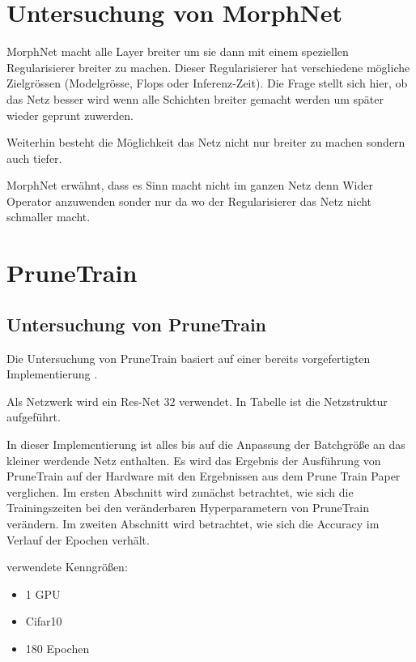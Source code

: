 \chapter{Untersuchung von MorphNet}\label{sec:morphexperimente}
MorphNet macht alle Layer breiter um sie dann mit einem speziellen Regularisierer breiter zu machen. Dieser Regularisierer hat verschiedene mögliche Zielgrössen (Modelgrösse, Flops oder Inferenz-Zeit).
Die Frage stellt sich hier, ob das Netz besser wird wenn alle Schichten breiter gemacht werden um später wieder geprunt zuwerden.

Weiterhin besteht die Möglichkeit das Netz nicht nur breiter zu machen sondern auch tiefer.


MorphNet erwähnt, dass es Sinn macht nicht im ganzen Netz denn Wider Operator anzuwenden sonder nur da wo der Regularisierer das Netz nicht schmaller macht.





\chapter{PruneTrain}
\color{black}
\section{Untersuchung von PruneTrain}\label{sec:ptexperimente}
\color{blue1}
Die Untersuchung von PruneTrain basiert auf einer bereits vorgefertigten Implementierung \cite{ptImpl}. 


Als Netzwerk wird ein Res-Net 32 verwendet. In Tabelle  ist die Netzstruktur aufgeführt.


In dieser Implementierung ist alles bis auf die Anpassung der Batchgröße an das kleiner werdende Netz enthalten. Es wird das Ergebnis der Ausführung von PruneTrain auf der Hardware mit den Ergebnissen aus dem Prune Train Paper verglichen. Im ersten Abschnitt wird zunächst betrachtet, wie sich die Trainingszeiten bei den veränderbaren Hyperparametern von PruneTrain verändern. Im zweiten Abschnitt wird betrachtet, wie sich die Accuracy im Verlauf der Epochen verhält.




verwendete Kenngrößen:

\begin{itemize}
 \item 1 GPU
 \item Cifar10
 \item 180 Epochen
\end{itemize}

